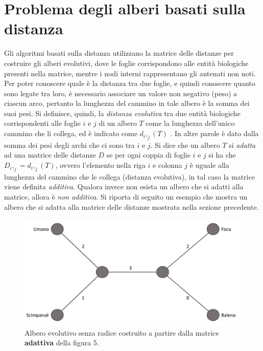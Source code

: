 \section{Problema degli alberi basati sulla distanza}
Gli algoritmi basati sulla distanza utilizzano la matrice delle distanze per costruire gli alberi evolutivi, dove le foglie corrispondono alle entità biologiche presenti nella matrice, mentre i nodi interni rappresentano gli antenati non noti. Per poter conoscere quale è la distanza tra due foglie, e quindi conoscere quanto sono legate tra loro, è necessario associare un valore non negativo (peso) a ciascun arco, pertanto la lunghezza del cammino in tale albero è la somma dei suoi pesi. Si definisce, quindi, la \textit{distanza evolutiva} tra due entità biologiche corrispondenti alle foglie $i$ e $j$ di un albero $T$ come la lunghezza dell'unico cammino che li collega, ed è indicato come $d_i,_j(T)$ \cite{bioinfalganactivelearningapproachparttwo}. In altre parole è dato dalla somma dei pesi degli archi che ci sono tra $i$ e $j$.
\newline
Si dice che un albero $T$ si \textit{adatta} ad una matrice delle distanze $D$ se per ogni coppia di foglie $i$ e $j$ si ha che $D_i,_j=d_i,_j(T)$, ovvero l'elemento nella riga $i$ e colonna $j$ è uguale alla lunghezza del cammino che le collega (distanza evolutiva), in tal caso la matrice viene definita \textit{additiva}. Qualora invece non esista un albero che si adatti alla matrice, allora è \textit{non additiva}.
\newline
Si riporta di seguito un esempio che mostra un albero che si adatta alla matrice delle distanze mostrata nella sezione precedente.
\begin{figure}[h!]
	\includegraphics[width=\linewidth]{unrooted_tree_created_by_figure_5.jpg}
 	\caption{Albero evolutivo senza radice costruito a partire dalla matrice \textbf{adattiva} della figura 5.}
  	\label{fig:EvolutionaryTreeExample}
\end{figure}
